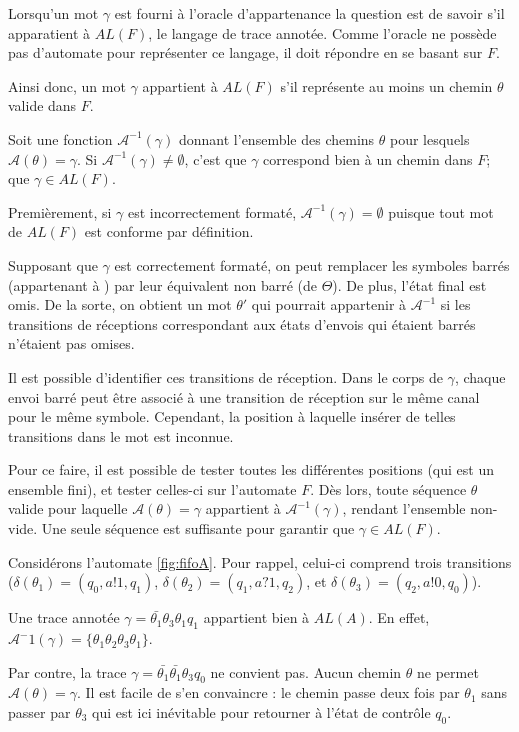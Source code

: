 Lorsqu'un mot $\gamma$ est fourni à l'oracle d'appartenance la question est de savoir s'il apparatient à $AL(F)$, le langage de trace annotée. Comme l'oracle ne possède pas d'automate pour représenter ce langage, il doit répondre en se basant sur $F$.

Ainsi donc, un mot $\gamma$ appartient à $AL(F)$ s'il représente au moins un chemin $\theta$ valide dans $F$.

Soit une fonction $\mathcal{A}^{-1}(\gamma)$ donnant l'ensemble des chemins $\theta$ pour lesquels $\mathcal{A}(\theta)=\gamma$. Si $\mathcal{A}^{-1}(\gamma)\neq\emptyset$, c'est que $\gamma$ correspond bien à un chemin dans $F$; que $\gamma\in AL(F)$.

Premièrement, si $\gamma$ est incorrectement formaté, $\mathcal{A^{-1}}(\gamma)=\emptyset$ puisque tout mot de $AL(F)$ est conforme par définition.

Supposant que $\gamma$ est correctement formaté, on peut remplacer les symboles barrés (appartenant à \barTheta) par leur équivalent non barré (de $\Theta$). De plus, l'état final est omis. De la sorte, on obtient un mot $\theta'$ qui pourrait appartenir à $\mathcal{A}^{-1}$ si les transitions de réceptions correspondant aux états d'envois qui étaient barrés n'étaient pas omises.

Il est possible d'identifier ces transitions de réception. Dans le corps de $\gamma$, chaque envoi barré peut être associé à une transition de réception sur le même canal pour le même symbole. Cependant, la position à laquelle insérer de telles transitions dans le mot est inconnue.

Pour ce faire, il est possible de tester toutes les différentes positions (qui est un ensemble fini), et tester celles-ci sur l'automate $F$. Dès lors, toute séquence $\theta$ valide pour laquelle $\mathcal{A}(\theta)=\gamma$ appartient à $\mathcal{A}^{-1}(\gamma)$, rendant l'ensemble non-vide. Une seule séquence est suffisante pour garantir que $\gamma\in AL(F)$.

\begin{example}
Considérons l'automate \ref{fig:fifoA}. Pour rappel, celui-ci comprend trois transitions ($\delta(\theta_1)=(q_0, a!1, q_1)$, $\delta(\theta_2)=(q_1,a?1,q_2)$, et $\delta(\theta_3)=(q_2, a!0, q_0)$).

Une trace annotée $\gamma=\bar{\theta_1}\theta_3\theta_1q_1$ appartient bien à $AL(A)$. En effet, $\mathcal{A}^-1(\gamma)=\{\theta_1\theta_2\theta_3\theta_1\}$.

Par contre, la trace $\gamma=\bar{\theta_1}\bar{\theta_1}\theta_3q_0$ ne convient pas. Aucun chemin $\theta$ ne permet $\mathcal{A}(\theta)=\gamma$. Il est facile de s'en convaincre : le chemin passe deux fois par $\theta_1$ sans passer par $\theta_3$ qui est ici inévitable pour retourner à l'état de contrôle $q_0$.

\end{example}
